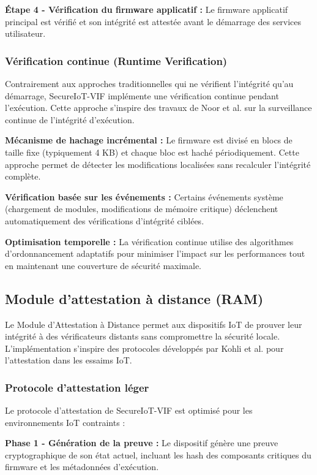 \textbf{Étape 4 - Vérification du firmware applicatif :} Le firmware applicatif principal est vérifié et son intégrité est attestée avant le démarrage des services utilisateur.

\subsubsection{Vérification continue (Runtime Verification)}

Contrairement aux approches traditionnelles qui ne vérifient l'intégrité qu'au démarrage, SecureIoT-VIF implémente une vérification continue pendant l'exécution. Cette approche s'inspire des travaux de Noor et al. \cite{Noor2025EILID} sur la surveillance continue de l'intégrité d'exécution.

\textbf{Mécanisme de hachage incrémental :} Le firmware est divisé en blocs de taille fixe (typiquement 4 KB) et chaque bloc est haché périodiquement. Cette approche permet de détecter les modifications localisées sans recalculer l'intégrité complète.

\textbf{Vérification basée sur les événements :} Certains événements système (chargement de modules, modifications de mémoire critique) déclenchent automatiquement des vérifications d'intégrité ciblées.

\textbf{Optimisation temporelle :} La vérification continue utilise des algorithmes d'ordonnancement adaptatifs pour minimiser l'impact sur les performances tout en maintenant une couverture de sécurité maximale.

\subsection{Module d'attestation à distance (RAM)}

Le Module d'Attestation à Distance permet aux dispositifs IoT de prouver leur intégrité à des vérificateurs distants sans compromettre la sécurité locale. L'implémentation s'inspire des protocoles développés par Kohli et al. \cite{Kohli2024SwarmNet} pour l'attestation dans les essaims IoT.

\subsubsection{Protocole d'attestation léger}

Le protocole d'attestation de SecureIoT-VIF est optimisé pour les environnements IoT contraints :

\textbf{Phase 1 - Génération de la preuve :} Le dispositif génère une preuve cryptographique de son état actuel, incluant les hash des composants critiques du firmware et les métadonnées d'exécution.

